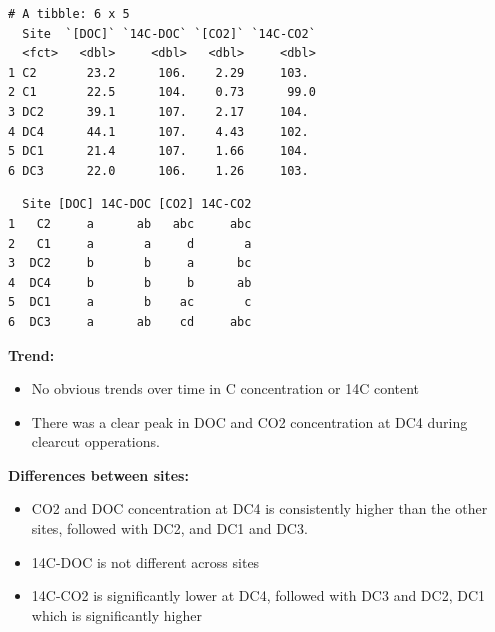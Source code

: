 \documentclass[
]{article}
\begin{document}
\begin{verbatim}
# A tibble: 6 x 5
  Site  `[DOC]` `14C-DOC` `[CO2]` `14C-CO2`
  <fct>   <dbl>     <dbl>   <dbl>     <dbl>
1 C2       23.2      106.    2.29     103. 
2 C1       22.5      104.    0.73      99.0
3 DC2      39.1      107.    2.17     104. 
4 DC4      44.1      107.    4.43     102. 
5 DC1      21.4      107.    1.66     104. 
6 DC3      22.0      106.    1.26     103. 
\end{verbatim}

\begin{verbatim}
  Site [DOC] 14C-DOC [CO2] 14C-CO2
1   C2     a      ab   abc     abc
2   C1     a       a     d       a
3  DC2     b       b     a      bc
4  DC4     b       b     b      ab
5  DC1     a       b    ac       c
6  DC3     a      ab    cd     abc
\end{verbatim}

\begin{tcolorbox}[enhanced jigsaw, coltitle=black, opacitybacktitle=0.6, left=2mm, bottomtitle=1mm, colback=white, toprule=.15mm, arc=.35mm, toptitle=1mm, leftrule=.75mm, rightrule=.15mm, colbacktitle=quarto-callout-note-color!10!white, breakable, titlerule=0mm, bottomrule=.15mm, colframe=quarto-callout-note-color-frame, title=\textcolor{quarto-callout-note-color}{\faInfo}\hspace{0.5em}{Interpretation}, opacityback=0]

\textbf{Trend:}

\begin{itemize}
\item
  No obvious trends over time in C concentration or 14C content
\item
  There was a clear peak in DOC and CO2 concentration at DC4 during
  clearcut opperations.
\end{itemize}

\textbf{Differences between sites:}

\begin{itemize}
\item
  CO2 and DOC concentration at DC4 is consistently higher than the other
  sites, followed with DC2, and DC1 and DC3.
\item
  14C-DOC is not different across sites
\item
  14C-CO2 is significantly lower at DC4, followed with DC3 and DC2, DC1
  which is significantly higher
\end{itemize}

\end{tcolorbox}
\end{document}
